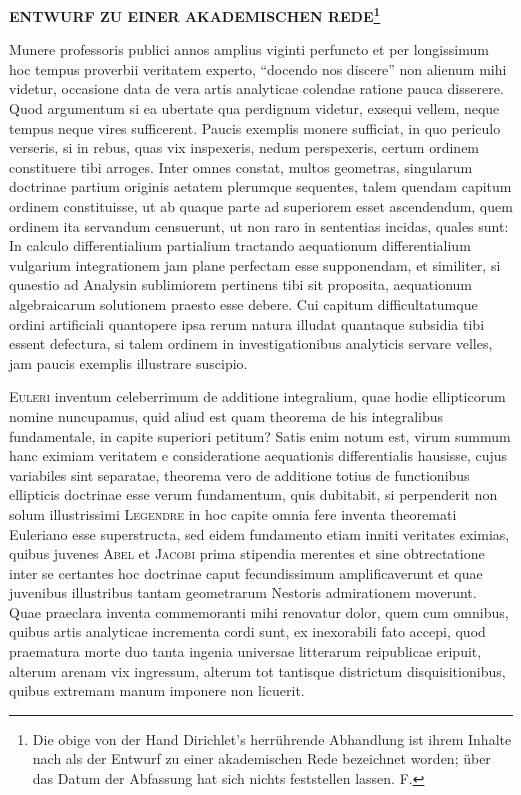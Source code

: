 \documentclass[11pt]{article}
\newcommand{\scn}[1]{\textsc{#1}}
\begin{document}
\begin{center}
{\Large\bfseries ENTWURF ZU EINER AKADEMISCHEN REDE\footnote{Die obige von der Hand Dirichlet's herrührende Abhandlung ist ihrem Inhalte nach als der Entwurf zu einer akademischen Rede bezeichnet worden; über das Datum der Abfassung hat sich nichts feststellen lassen. F.}\par}
\vspace{0.8em}
\end{center}

Munere professoris publici annos amplius viginti perfuncto et per longissimum hoc tempus proverbii veritatem experto, ``docendo nos discere'' non alienum mihi videtur, occasione data de vera artis analyticae colendae ratione pauca disserere. Quod argumentum si ea ubertate qua perdignum videtur, exsequi vellem, neque tempus neque vires sufficerent. Paucis exemplis monere sufficiat, in quo periculo verseris, si in rebus, quas vix inspexeris, nedum perspexeris, certum ordinem constituere tibi arroges. Inter omnes constat, multos geometras, singularum doctrinae partium originis aetatem plerumque sequentes, talem quendam capitum ordinem constituisse, ut ab quaque parte ad superiorem esset ascendendum, quem ordinem ita servandum censuerunt, ut non raro in sententias incidas, quales sunt: In calculo differentialium partialium tractando aequationum differentialium vulgarium integrationem jam plane perfectam esse supponendam, et similiter, si quaestio ad Analysin sublimiorem pertinens tibi sit proposita, aequationum algebraicarum solutionem praesto esse debere. Cui capitum difficultatumque ordini artificiali quantopere ipsa rerum natura illudat quantaque subsidia tibi essent defectura, si talem ordinem in investigationibus analyticis servare velles, jam paucis exemplis illustrare suscipio.

\scn{Euleri} inventum celeberrimum de additione integralium, quae hodie ellipticorum nomine nuncupamus, quid aliud est quam theorema de his integralibus fundamentale, in capite superiori petitum? Satis enim notum est, virum summum hanc eximiam veritatem e consideratione aequationis differentialis hausisse, cujus variabiles sint separatae, theorema vero de additione totius de functionibus ellipticis doctrinae esse verum fundamentum, quis dubitabit, si perpenderit non solum illustrissimi \scn{Legendre} in hoc capite omnia fere inventa theoremati Euleriano esse superstructa, sed eidem fundamento etiam inniti veritates eximias, quibus juvenes \scn{Abel} et \scn{Jacobi} prima stipendia merentes et sine obtrectatione inter se certantes hoc doctrinae caput fecundissimum amplificaverunt et quae juvenibus illustribus tantam geometrarum Nestoris admirationem moverunt. Quae praeclara inventa commemoranti mihi renovatur dolor, quem cum omnibus, quibus artis analyticae incrementa cordi sunt, ex inexorabili fato accepi, quod praematura morte duo tanta ingenia universae litterarum reipublicae eripuit, alterum arenam vix ingressum, alterum tot tantisque districtum disquisitionibus, quibus extremam manum imponere non licuerit.
\end{document}
